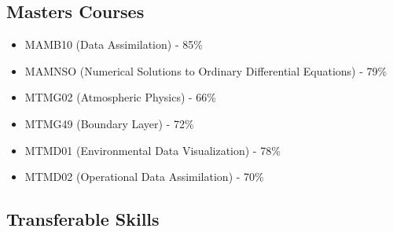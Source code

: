 \documentclass[11pt]{article}
\begin{document}
\subsection{Masters Courses}
\begin{itemize}
\item MAMB10 (Data Assimilation) - 85\%
\item MAMNSO (Numerical Solutions to Ordinary Differential Equations) - 79\%
\item MTMG02 (Atmospheric Physics) - 66\%
\item MTMG49 (Boundary Layer) - 72\%
\item MTMD01 (Environmental Data Visualization) - 78\%
\item MTMD02 (Operational Data Assimilation) - 70\%
\end{itemize}

\subsection{Transferable Skills}
\end{document}
